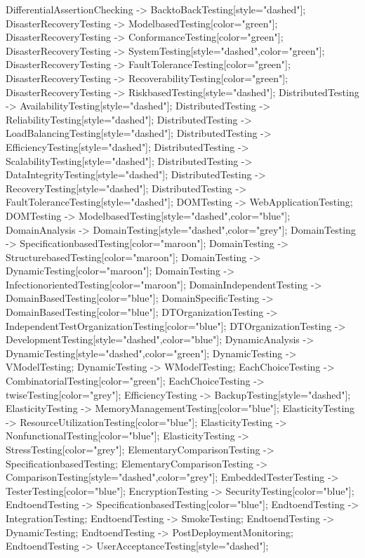 \documentclass{article}
\begin{document}
{DifferentialAssertionChecking -> BacktoBackTesting[style="dashed"];
DisasterRecoveryTesting -> ModelbasedTesting[color="green"];
DisasterRecoveryTesting -> ConformanceTesting[color="green"];
DisasterRecoveryTesting -> SystemTesting[style="dashed",color="green"];
DisasterRecoveryTesting -> FaultToleranceTesting[color="green"];
DisasterRecoveryTesting -> RecoverabilityTesting[color="green"];
DisasterRecoveryTesting -> RiskbasedTesting[style="dashed"];
DistributedTesting -> AvailabilityTesting[style="dashed"];
DistributedTesting -> ReliabilityTesting[style="dashed"];
DistributedTesting -> LoadBalancingTesting[style="dashed"];
DistributedTesting -> EfficiencyTesting[style="dashed"];
DistributedTesting -> ScalabilityTesting[style="dashed"];
DistributedTesting -> DataIntegrityTesting[style="dashed"];
DistributedTesting -> RecoveryTesting[style="dashed"];
DistributedTesting -> FaultToleranceTesting[style="dashed"];
DOMTesting -> WebApplicationTesting;
DOMTesting -> ModelbasedTesting[style="dashed",color="blue"];
DomainAnalysis -> DomainTesting[style="dashed",color="grey"];
DomainTesting -> SpecificationbasedTesting[color="maroon"];
DomainTesting -> StructurebasedTesting[color="maroon"];
DomainTesting -> DynamicTesting[color="maroon"];
DomainTesting -> InfectionorientedTesting[color="maroon"];
DomainIndependentTesting -> DomainBasedTesting[color="blue"];
DomainSpecificTesting -> DomainBasedTesting[color="blue"];
DTOrganizationTesting -> IndependentTestOrganizationTesting[color="blue"];
DTOrganizationTesting -> DevelopmentTesting[style="dashed",color="blue"];
DynamicAnalysis -> DynamicTesting[style="dashed",color="green"];
DynamicTesting -> VModelTesting;
DynamicTesting -> WModelTesting;
EachChoiceTesting -> CombinatorialTesting[color="green"];
EachChoiceTesting -> twiseTesting[color="grey"];
EfficiencyTesting -> BackupTesting[style="dashed"];
ElasticityTesting -> MemoryManagementTesting[color="blue"];
ElasticityTesting -> ResourceUtilizationTesting[color="blue"];
ElasticityTesting -> NonfunctionalTesting[color="blue"];
ElasticityTesting -> StressTesting[color="grey"];
ElementaryComparisonTesting -> SpecificationbasedTesting;
ElementaryComparisonTesting -> ComparisonTesting[style="dashed",color="grey"];
EmbeddedTesterTesting -> TesterTesting[color="blue"];
EncryptionTesting -> SecurityTesting[color="blue"];
EndtoendTesting -> SpecificationbasedTesting[color="blue"];
EndtoendTesting -> IntegrationTesting;
EndtoendTesting -> SmokeTesting;
EndtoendTesting -> DynamicTesting;
EndtoendTesting -> PostDeploymentMonitoring;
EndtoendTesting -> UserAcceptanceTesting[style="dashed"];
}
\end{document}
